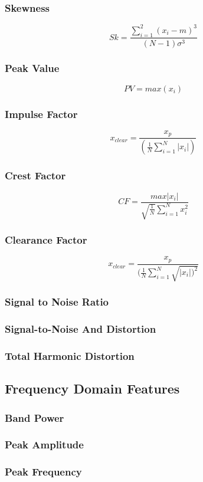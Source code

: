 \documentclass{article}
\begin{document}
\subsubsection{Skewness} 
$$ Sk = \frac{\sum^2_{i=1}(x_i-m)^3}{(N-1)\sigma^3} $$
\subsubsection{Peak Value}
$$ PV = max(x_i) $$ 
\subsubsection{Impulse Factor} 
$$ x_{clear} = \frac{x_p}{(\frac{1}{N}\sum^N_{i=1}|x_i|)} $$  
\subsubsection{Crest Factor} 
$$ CF = \frac{max|x_i|}{\sqrt{\frac{1}{N}}\sum^N_{i=1}x^2_i} $$
\subsubsection{Clearance Factor} 
$$ x_{clear} = \frac{x_p}{(\frac{1}{N}\sum^N_{i=1}\sqrt{|x_i|)^2}} $$
\subsubsection{Signal to Noise Ratio} 
\subsubsection{Signal-to-Noise And Distortion} 
\subsubsection{Total Harmonic Distortion}   
\subsection{Frequency Domain Features}
\subsubsection{Band Power}
\subsubsection{Peak Amplitude}
\subsubsection{Peak Frequency}
\end{document}
